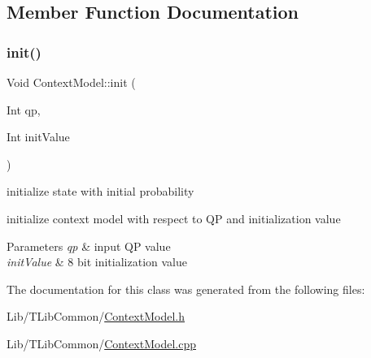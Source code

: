 \subsection{Member Function Documentation}
\mbox{\label{class_context_model_aaa5e3418f274f7de8f7d99731a130f1a}} 
\subsubsection{\texorpdfstring{init()}{init()}}
{\footnotesize\ttfamily Void Context\+Model\+::init (\begin{DoxyParamCaption}\item[{Int}]{qp,  }\item[{Int}]{init\+Value }\end{DoxyParamCaption})}



initialize state with initial probability 


\begin{DoxyItemize}
\item initialize context model with respect to QP and initialization value
\end{DoxyItemize}
\begin{DoxyParams}{Parameters}
{\em qp} & input QP value \\
\hline
{\em init\+Value} & 8 bit initialization value \\
\hline
\end{DoxyParams}


The documentation for this class was generated from the following files\+:\begin{DoxyCompactItemize}
\item 
Lib/\+T\+Lib\+Common/\hyperlink{_context_model_8h}{Context\+Model.\+h}\item 
Lib/\+T\+Lib\+Common/\hyperlink{_context_model_8cpp}{Context\+Model.\+cpp}\end{DoxyCompactItemize}
